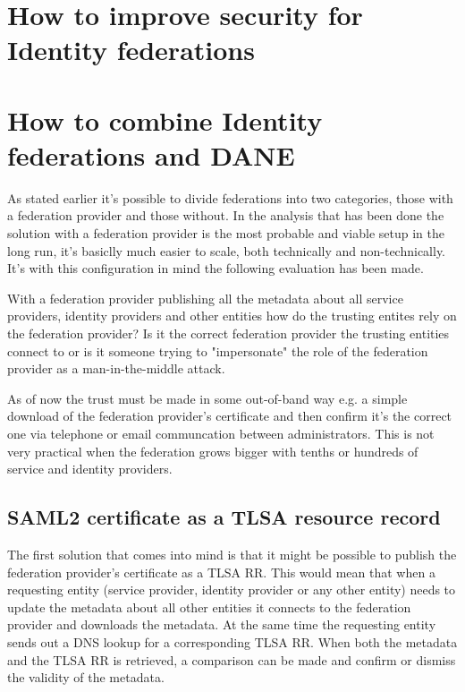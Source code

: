 \section{How to improve security for Identity federations}
\section{How to combine Identity federations and DANE}
As stated earlier it's possible to divide federations into two categories, those with a federation provider and those without.
In the analysis that has been done the solution with a federation provider is the most probable and viable setup in the long run, it's basiclly much easier to scale, both technically and non-technically.
It's with this configuration in mind the following evaluation has been made.


With a federation provider publishing all the metadata about all service providers, identity providers and other entities how do the trusting entites rely on the federation provider?
Is it the correct federation provider the trusting entities connect to or is it someone trying to "impersonate" the role of the federation provider as a man-in-the-middle attack.

As of now the trust must be made in some out-of-band way e.g. a simple download of the federation provider's certificate and then confirm it's the correct one via telephone or email communcation between administrators.
This is not very practical when the federation grows bigger with tenths or hundreds of service and identity providers.

\subsection{SAML2 certificate as a TLSA resource record}
\label{subsec:saml2-certificate-as-tlsa}
The first solution that comes into mind is that it might be possible to publish the federation provider's certificate as a TLSA RR.
This would mean that when a requesting entity (service provider, identity provider or any other entity) needs to update the metadata about all other entities it connects to the federation provider and downloads the metadata.
At the same time the requesting entity sends out a DNS lookup for a corresponding TLSA RR.
When both the metadata and the TLSA RR is retrieved, a comparison can be made and confirm or dismiss the validity of the metadata.


